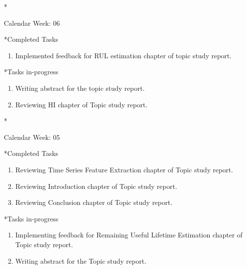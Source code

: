 \documentclass[11pt,a4paper]{article}
\begin{document}
\newpage
\begin{section}*{Calendar Week: 06  \hfill \date{12 February, 2021}}
 \begin{refsection}
     \begin{subsection}*{Completed Tasks}
         \begin{enumerate}
             \item
                   Implemented feedback for RUL estimation chapter of topic study report.
         \end{enumerate}
     \end{subsection}
     \begin{subsection}*{Tasks in-progress}
         \begin{enumerate}
             \item
                   Writing abstract for the topic study report.
             \item
                   Reviewing HI chapter of Topic study report.

         \end{enumerate}
     \end{subsection}
 \end{refsection}
\end{section}

\newpage
\begin{section}*{Calendar Week: 05  \hfill \date{5 February, 2021}}
 \begin{refsection}
     \begin{subsection}*{Completed Tasks}
         \begin{enumerate}
             \item
                   Reviewing Time Series Feature Extraction chapter of Topic study report.
             \item
                   Reviewing Introduction chapter of Topic study report.
             \item
                   Reviewing Conclusion chapter of Topic study report.
         \end{enumerate}
     \end{subsection}
     \begin{subsection}*{Tasks in-progress}
         \begin{enumerate}
             \item
                   Implementing feedback for Remaining Useful Lifetime Estimation chapter of Topic study report.
             \item
                   Writing abstract for the Topic study report.
         \end{enumerate}
     \end{subsection}
 \end{refsection}
\end{section}
\end{document}
